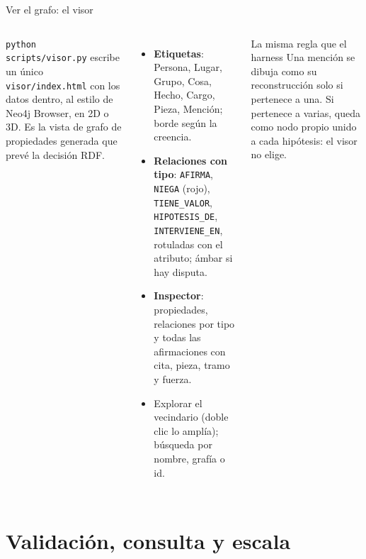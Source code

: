 \documentclass[aspectratio=169,10pt]{beamer}
\newcommand{\ttt}[1]{\texttt{\small #1}}
\begin{document}
\begin{frame}{Ver el grafo: el visor}
\begin{columns}[T]
\small
\ttt{python scripts/visor.py} escribe un único \ttt{visor/index.html} con los datos dentro, al estilo de Neo4j
Browser, en 2D o 3D. Es la \alert{vista de grafo de propiedades generada} que prevé la decisión RDF.
\begin{itemize}\footnotesize
\item \textbf{Etiquetas}: Persona, Lugar, Grupo, Cosa, Hecho, Cargo, Pieza, Mención; borde según la creencia.
\item \textbf{Relaciones con tipo}: \ttt{AFIRMA}, \ttt{NIEGA} (rojo), \ttt{TIENE\_VALOR}, \ttt{HIPOTESIS\_DE},
      \ttt{INTERVIENE\_EN}, rotuladas con el atributo; ámbar si hay disputa.
\item \textbf{Inspector}: propiedades, relaciones por tipo y todas las afirmaciones con cita, pieza, tramo y fuerza.
\item Explorar el vecindario (doble clic lo amplía); búsqueda por nombre, grafía o id.
\end{itemize}
\begin{block}{La misma regla que el harness}
Una mención se dibuja como su reconstrucción solo si pertenece a \alert{una}. Si pertenece a varias, queda como nodo
propio unido a cada hipótesis: el visor no elige.
\end{block}
\end{columns}
\end{frame}

\section{Validación, consulta y escala}
\end{document}
